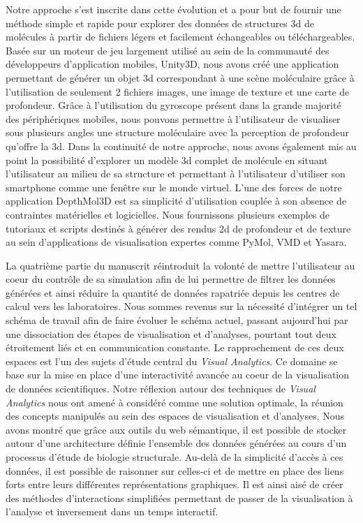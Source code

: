 Notre approche s'est inscrite dans cette évolution et a pour but de fournir une méthode simple et rapide pour explorer des données de structures 3d de molécules à partir de fichiers légers et facilement échangeables ou téléchargeables. Basée sur un moteur de jeu largement utilisé au sein de la communauté des développeurs d'application mobiles, Unity3D, nous avons créé une application permettant de générer un objet 3d correspondant à une scène moléculaire grâce à l'utilisation de seulement 2 fichiers images, une image de texture et une carte de profondeur. Grâce à l'utilisation du gyroscope présent dans la grande majorité des périphériques mobiles, nous pouvons permettre à l'utilisateur de visualiser sous plusieurs angles une structure moléculaire avec la perception de profondeur qu'offre la 3d.
Dans la continuité de notre approche, nous avons également mis au point la possibilité d'explorer un modèle 3d complet de molécule en situant l'utilisateur au milieu de sa structure et permettant à l'utilisateur d'utiliser son smartphone comme une fenêtre sur le monde virtuel.
L'une des forces de notre application DepthMol3D est sa simplicité d'utilisation couplée à son absence de contraintes matérielles et logicielles. Nous fournissons plusieurs exemples de tutoriaux et scripts destinés à générer des rendus 2d de profondeur et de texture au sein d'applications de visualisation expertes comme PyMol, VMD et Yasara.


La quatrième partie du manuscrit réintroduit la volonté de mettre l'utilisateur au coeur du contrôle de sa simulation afin de lui permettre de filtrer les données générées et ainsi réduire la quantité de données rapatriée depuis les centres de calcul vers les laboratoires. Nous sommes revenus sur la nécessité d'intégrer un tel schéma de travail afin de faire évoluer le schéma actuel, passant aujourd'hui par une dissociation des étapes de visualisation et d'analyses, pourtant tout deux étroitement liés et en communication constante.
Le rapprochement de ces deux espaces est l'un des sujets d'étude central du \textit{Visual Analytics}. Ce domaine se base sur la mise en place d'une interactivité avancée au coeur de la visualisation de données scientifiques. Notre réflexion autour des techniques de \textit{Visual Analytics} nous ont amené à considéré comme une solution optimale, la réunion des concepts manipulés au sein des espaces de visualisation et d'analyses.
Nous avons montré que grâce aux outils du web sémantique, il est possible de stocker autour d'une architecture définie l'ensemble des données générées au cours d'un processus d'étude de biologie structurale. Au-delà de la simplicité d'accès à ces données, il est possible de raisonner sur celles-ci et de mettre en place des liens forts entre leurs différentes représentations graphiques. Il est ainsi aisé de créer des méthodes d'interactions simplifiées permettant de passer de la visualisation à l'analyse et inversement dans un temps interactif.

